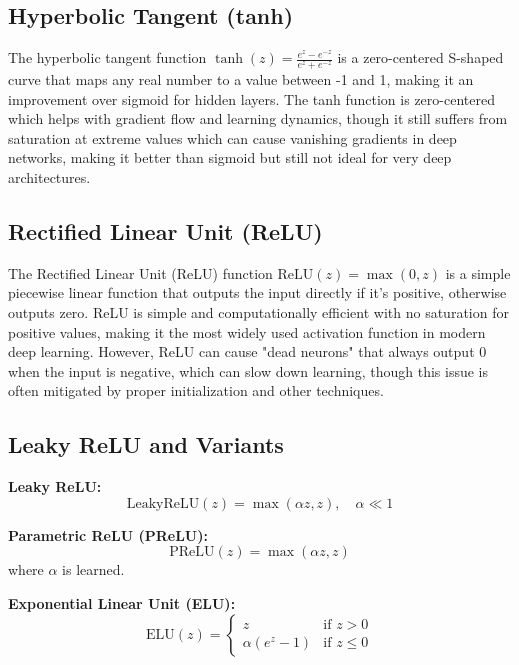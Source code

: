 \subsection{Hyperbolic Tangent (tanh)}

The hyperbolic tangent function $\tanh(z) = \frac{e^z - e^{-z}}{e^z + e^{-z}}$ is a zero-centered S-shaped curve that maps any real number to a value between -1 and 1, making it an improvement over sigmoid for hidden layers. The tanh function is zero-centered which helps with gradient flow and learning dynamics, though it still suffers from saturation at extreme values which can cause vanishing gradients in deep networks, making it better than sigmoid but still not ideal for very deep architectures.

\subsection{Rectified Linear Unit (ReLU)}

The Rectified Linear Unit (ReLU) function $\text{ReLU}(z) = \max(0, z)$ is a simple piecewise linear function that outputs the input directly if it's positive, otherwise outputs zero. ReLU is simple and computationally efficient with no saturation for positive values, making it the most widely used activation function in modern deep learning. However, ReLU can cause "dead neurons" that always output 0 when the input is negative, which can slow down learning, though this issue is often mitigated by proper initialization and other techniques.

\subsection{Leaky ReLU and Variants}

\textbf{Leaky ReLU:}
\begin{equation}
\text{LeakyReLU}(z) = \max(\alpha z, z), \quad \alpha \ll 1
\end{equation}

\textbf{Parametric ReLU (PReLU):}
\begin{equation}
\text{PReLU}(z) = \max(\alpha z, z)
\end{equation}
where $\alpha$ is learned.

\textbf{Exponential Linear Unit (ELU):}
\begin{equation}
\text{ELU}(z) = \begin{cases}
z & \text{if } z > 0 \\
\alpha(e^z - 1) & \text{if } z \leq 0
\end{cases}
\end{equation}

